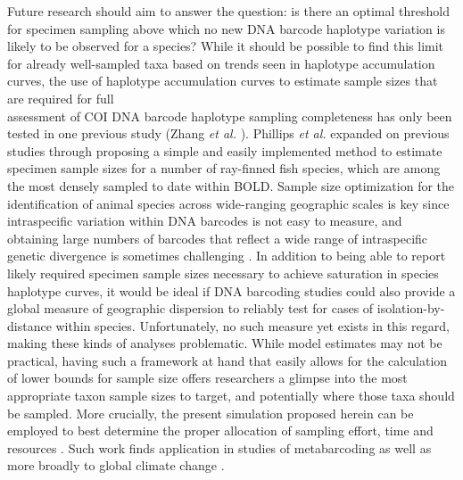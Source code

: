 Future research should aim to answer the question: is there an optimal threshold for specimen sampling above which no new DNA barcode haplotype variation is likely to be observed for a species? While it should be possible to find this limit for already well-sampled taxa based on trends seen in haplotype accumulation curves, the use of haplotype accumulation curves to estimate sample sizes that are required for full \\ assessment of COI DNA barcode haplotype sampling completeness has only been tested in one previous study (Zhang \textit{et al.} \cite{zhang2010estimating}). Phillips \textit{et al.} \cite{phillips2015exploration} expanded on previous studies through proposing a simple and easily implemented method to estimate specimen sample sizes for a number of ray-finned fish species, which are among the most densely sampled to date within BOLD. Sample size optimization for the identification of animal species across wide-ranging geographic scales is key since intraspecific variation within DNA barcodes is not easy to measure, and obtaining large numbers of barcodes that reflect a wide range of intraspecific genetic divergence is sometimes challenging \cite{bertolazzi2009learning}. In addition to being able to report likely required specimen sample sizes necessary to achieve saturation in species haplotype curves, it would be ideal if DNA barcoding studies could also provide a global measure of geographic dispersion to reliably test for cases of isolation-by-distance within species. Unfortunately, no such measure yet exists in this regard, making these kinds of analyses problematic. While model estimates may not be practical, having such a framework at hand that easily allows for the calculation of lower bounds for sample size offers researchers a glimpse into the most appropriate taxon sample sizes to target, and potentially where those taxa should be sampled. More crucially, the present simulation proposed herein can be employed to best determine the proper allocation of sampling effort, time and resources \cite{hortal2005ed}. Such work finds application in studies of metabarcoding \cite{wares2015can} as well as more broadly to global climate change \cite{pfenninger2012methodological}.



